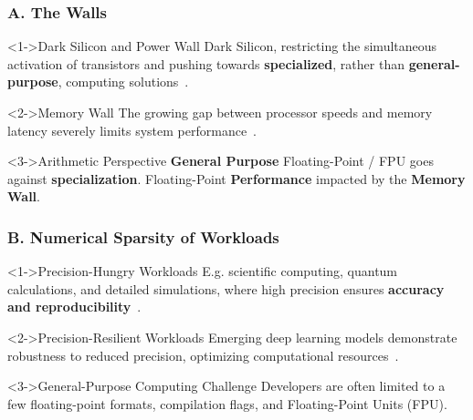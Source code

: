 \begin{frame}
    \frametitle{A. The Walls}

    \begin{alertblock}<1->{Dark Silicon and Power Wall}
	    Dark Silicon, restricting the simultaneous activation of transistors and pushing towards \textbf{specialized}, rather than \textbf{general-purpose}, computing solutions~\cite{shafique_eda_2014}.
    \end{alertblock}

    \begin{alertblock}<2->{Memory Wall}
        The growing gap between processor speeds and memory latency severely limits system performance~\cite{dennard_design_1999}.
    \end{alertblock}

    \begin{block}<3->{Arithmetic Perspective}
	    \textbf{General Purpose} Floating-Point / FPU goes against \textbf{specialization}.
	    Floating-Point \textbf{Performance} impacted by the \textbf{Memory Wall}.
    \end{block}

\end{frame}


\begin{frame}
  \frametitle{B. Numerical Sparsity of Workloads}

    \begin{alertblock}<1->{Precision-Hungry Workloads}
	  E.g. scientific computing, quantum calculations, and detailed simulations, where high precision ensures \textbf{accuracy and reproducibility}~\cite{beliakov_parallel_2013,zhang_qed_1996,ellis_one-loop_2009,lake_sir_1996}.
    \end{alertblock}

    \begin{alertblock}<2->{Precision-Resilient Workloads}
        Emerging deep learning models demonstrate robustness to reduced precision, optimizing computational resources~\cite{johnson_rethinking_2018,courbariaux_binarized_2016}.
    \end{alertblock}

    \begin{block}<3->{General-Purpose Computing Challenge}
	    Developers are often limited to a few floating-point formats, compilation flags, and Floating-Point Units (FPU).
    \end{block}
\end{frame}

